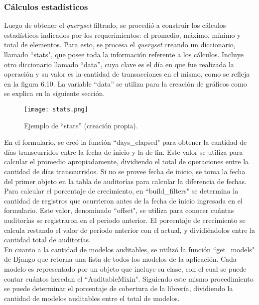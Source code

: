 \subsubsection{Cálculos estadísticos}

Luego de obtener el \textit{queryset} filtrado, se procedió a construir los cálculos estadísticos indicados por los requerimientos: el promedio, máximo, mínimo y total de elementos. Para esto, se procesa el \textit{queryset} creando un diccionario, llamado “stats",  que posee toda la información referente a los cálculos. Incluye otro diccionario llamado “data”, cuya clave es el día en que fue realizada la operación y su valor es la cantidad de transacciones en el mismo, como se refleja en la figura 6.10. La variable “data” se utiliza para la creación de gráficos como se explica en la siguiente sección.\\

\begin{figure}[h]
\centering
\texttt{[image: stats.png]}
\caption{Ejemplo de “stats” (creación propia).}
\label{fig:figura6.10}
\end{figure}

En el formulario, se creó la función “days\_elapsed" para obtener la cantidad de días transcurridos entre la fecha de inicio y la de fin. Este valor se utiliza para calcular el promedio apropiadamente, dividiendo el total de operaciones entre la cantidad de días transcurridos. Si no se provee fecha de inicio, se toma la fecha del primer objeto en la tabla de auditorías para calcular la diferencia de fechas.\\

Para calcular el porcentaje de crecimiento, en “build\_filters" se determina la cantidad de registros que ocurrieron antes de la fecha de inicio ingresada en el formulario. Este valor, denominado “offset", se utiliza para conocer cuántas auditorías se registraron en el periodo anterior. El porcentaje de crecimiento se calcula restando el valor de periodo anterior con el actual, y dividiéndolos entre la cantidad total de auditorías.\\

En cuanto a la cantidad de modelos auditables, se utilizó la función “get\_models" de Django que retorna una lista de todos los modelos de la aplicación. Cada modelo es representado por un objeto que incluye su clase, con el cual se puede contar cuántos heredan el “AuditableMixin". Siguiendo este mismo procedimiento se puede determinar el porcentaje de cobertura de la librería, dividiendo la cantidad de modelos auditables entre el total de modelos.\\

